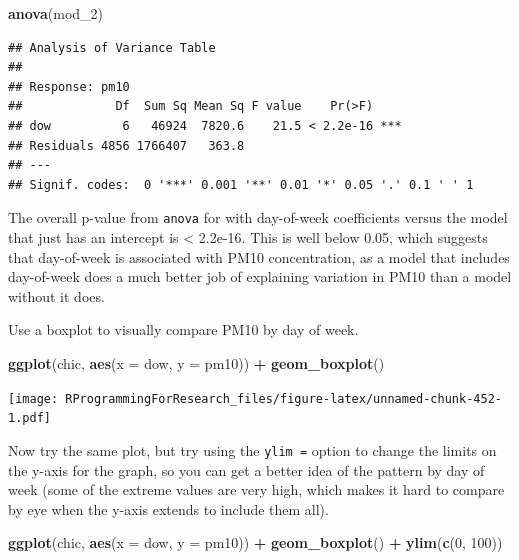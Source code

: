 \documentclass[]{book}
\makeatletter
\newenvironment{Shaded}{\begin{snugshade}}{\end{snugshade}}
\newcommand{\KeywordTok}[1]{\textcolor[rgb]{0.13,0.29,0.53}{\textbf{#1}}}
\newcommand{\DataTypeTok}[1]{\textcolor[rgb]{0.13,0.29,0.53}{#1}}
\newcommand{\DecValTok}[1]{\textcolor[rgb]{0.00,0.00,0.81}{#1}}
\newcommand{\StringTok}[1]{\textcolor[rgb]{0.31,0.60,0.02}{#1}}
\newcommand{\OperatorTok}[1]{\textcolor[rgb]{0.81,0.36,0.00}{\textbf{#1}}}
\newcommand{\NormalTok}[1]{#1}
\newenvironment{kframe}{%
\medskip{}
\setlength{\fboxsep}{.8em}
 \def\at@end@of@kframe{}%
 \ifinner\ifhmode%
  \def\at@end@of@kframe{\end{minipage}}%
  \begin{minipage}{\columnwidth}%
 \fi\fi%
 \def\FrameCommand##1{\hskip\@totalleftmargin \hskip-\fboxsep
 \colorbox{shadecolor}{##1}\hskip-\fboxsep
     \hskip-\linewidth \hskip-\@totalleftmargin \hskip\columnwidth}%
 \MakeFramed {\advance\hsize-\width
   \@totalleftmargin\z@ \linewidth\hsize
   \@setminipage}}%
 {\par\unskip\endMakeFramed%
 \at@end@of@kframe}
\renewenvironment{Shaded}{\begin{kframe}}{\end{kframe}}
\theoremstyle{definition}
\theoremstyle{definition}
\theoremstyle{definition}
\theoremstyle{remark}
\makeatother
\begin{document}
\begin{Shaded}
\begin{Highlighting}[]
\KeywordTok{anova}\NormalTok{(mod_}\DecValTok{2}\NormalTok{)}
\end{Highlighting}
\end{Shaded}

\begin{verbatim}
## Analysis of Variance Table
## 
## Response: pm10
##             Df  Sum Sq Mean Sq F value    Pr(>F)    
## dow          6   46924  7820.6    21.5 < 2.2e-16 ***
## Residuals 4856 1766407   363.8                      
## ---
## Signif. codes:  0 '***' 0.001 '**' 0.01 '*' 0.05 '.' 0.1 ' ' 1
\end{verbatim}

The overall p-value from \texttt{anova} for with day-of-week
coefficients versus the model that just has an intercept is \textless{}
2.2e-16. This is well below 0.05, which suggests that day-of-week is
associated with PM10 concentration, as a model that includes day-of-week
does a much better job of explaining variation in PM10 than a model
without it does.

Use a boxplot to visually compare PM10 by day of week.

\begin{Shaded}
\begin{Highlighting}[]
\KeywordTok{ggplot}\NormalTok{(chic, }\KeywordTok{aes}\NormalTok{(}\DataTypeTok{x =}\NormalTok{ dow, }\DataTypeTok{y =}\NormalTok{ pm10)) }\OperatorTok{+}\StringTok{ }
\StringTok{  }\KeywordTok{geom_boxplot}\NormalTok{()}
\end{Highlighting}
\end{Shaded}

\texttt{[image: RProgrammingForResearch\_files/figure-latex/unnamed-chunk-452-1.pdf]}

Now try the same plot, but try using the \texttt{ylim\ =} option to
change the limits on the y-axis for the graph, so you can get a better
idea of the pattern by day of week (some of the extreme values are very
high, which makes it hard to compare by eye when the y-axis extends to
include them all).

\begin{Shaded}
\begin{Highlighting}[]
\KeywordTok{ggplot}\NormalTok{(chic, }\KeywordTok{aes}\NormalTok{(}\DataTypeTok{x =}\NormalTok{ dow, }\DataTypeTok{y =}\NormalTok{ pm10)) }\OperatorTok{+}\StringTok{ }
\StringTok{  }\KeywordTok{geom_boxplot}\NormalTok{() }\OperatorTok{+}\StringTok{ }
\StringTok{  }\KeywordTok{ylim}\NormalTok{(}\KeywordTok{c}\NormalTok{(}\DecValTok{0}\NormalTok{, }\DecValTok{100}\NormalTok{))}
\end{Highlighting}
\end{Shaded}
\end{document}
